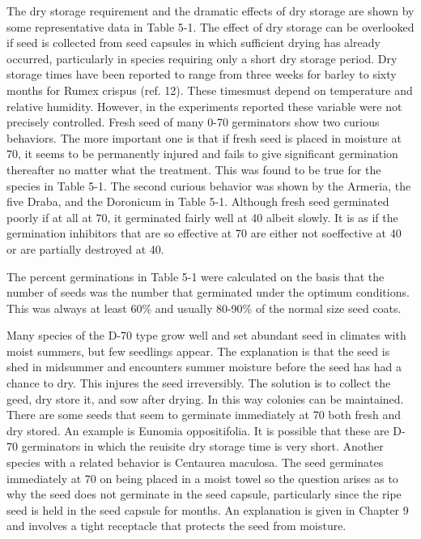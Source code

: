The dry storage requirement and the dramatic effects of dry storage are shown
by some representative data in Table 5-1. The effect of dry storage can be overlooked
if seed is collected from seed capsules in which sufficient drying has already occurred,
particularly in species requiring only a short dry storage period. Dry storage times
have been reported to range from three weeks for barley to sixty months for Rumex
crispus (ref. 12). These timesmust depend on temperature and relative humidity.
However, in the experiments reported these variable were not precisely controlled.
Fresh seed of many 0-70 germinators show two curious behaviors. The more
important one is that if fresh seed is placed in moisture at 70, it seems to be
permanently injured and fails to give significant germination thereafter no matter what
the treatment. This was found to be true for the species in Table 5-1. The second
curious behavior was shown by the Armeria, the five Draba, and the Doronicum in
Table 5-1. Although fresh seed germinated poorly if at all at 70, it germinated fairly
well at 40 albeit slowly. It is as if the germination inhibitors that are so effective at 70
are either not soeffective at 40 or are partially destroyed at 40.

The percent germinations in Table 5-1 were calculated on the basis that the
number of seeds was the number that germinated under the optimum conditions. This
was always at least 60\% and usually 80-90\% of the normal size seed coats.

Many species of the D-70 type grow well and set abundant seed in climates
with moist summers, but few seedlings appear. The explanation is that the seed is
shed in midsummer and encounters summer moisture before the seed has had a
chance to dry. This injures the seed irreversibly. The solution is to collect the geed,
dry store it, and sow after drying. In this way colonies can be maintained.
There are some seeds that seem to germinate immediately at 70 both fresh and
dry stored. An example is Eunomia oppositifolia. It is possible that these are D-70
germinators in which the reuisite dry storage time is very short. Another species with
a related behavior is Centaurea maculosa. The seed germinates immediately at 70 on
being placed in a moist towel so the question arises as to why the seed does not
germinate in the seed capsule, particularly since the ripe seed is held in the seed
capsule for months. An explanation is given in Chapter 9 and involves a tight
receptacle that protects the seed from moisture.

